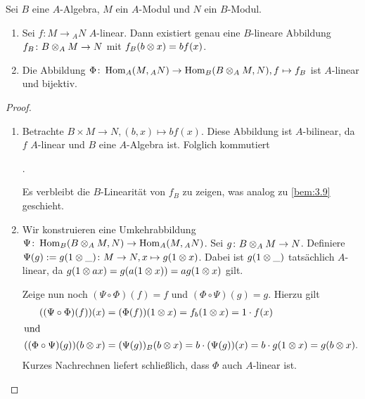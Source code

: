 \documentclass[12pt,a4paper]{scrartcl}
\theoremstyle{cplain}
\theoremstyle{cdef}
\begin{document}
\begin{satz}
	Sei $B$ eine $A$-Algebra, $M$ ein $A$-Modul und $N$ ein $B$-Modul.
	\begin{enumerate}
		\item Sei $f\colon M\to {}_AN$ $A$-linear. Dann existiert genau eine $B$-lineare Abbildung $f_B\colon B\otimes_AM\to N$ mit $f_B(b\otimes x) = bf(x)$. \label{thm:scalarerweiterung:i}
		\item Die Abbildung $\Phi\colon \operatorname{Hom}_A(M,{}_AN)\to \operatorname{Hom}_B(B\otimes_AM,N), f\mapsto f_B$ ist $A$-linear und bijektiv. \label{thm:scalarerweiterung:ii}
	\end{enumerate}
\end{satz}
\begin{proof}
	\leavevmode
	\begin{enumerate}[label=\ref{thm:scalarerweiterung:\roman*}]
		\item Betrachte $B\times M\to N, (b,x)\mapsto bf(x)$. Diese Abbildung ist $A$-bilinear, da $f$ $A$-linear und $B$ eine $A$-Algebra ist. Folglich kommutiert
		\begin{center}
			. %
		\end{center}
		Es verbleibt die $B$-Linearität von $f_B$ zu zeigen, was analog zu \cref{bem:3.9} geschieht.
		\item Wir konstruieren eine Umkehrabbildung $\Psi\colon \operatorname{Hom}_B(B\otimes_AM,N)\to \operatorname{Hom}_A(M,{}_AN)$. Sei $g\colon B\otimes_AM\to N$. Definiere $\Psi(g) := g(1\otimes \_)\colon M\to N, x\mapsto g(1\otimes x)$.
		Dabei ist $g(1\otimes\_)$ tatsächlich $A$-linear, da $g(1\otimes ax ) = g(a(1\otimes x)) = ag(1\otimes x)$ gilt.
		
		Zeige nun noch $(\Psi\circ \Phi)(f) = f$ und $(\Phi\circ\Psi)(g) = g$. Hierzu gilt
		\begin{align*}
			((\Psi\circ\Phi)(f))(x) &= (\Phi(f))(1\otimes x) = f_b(1\otimes x) =1\cdot f(x) \\
			\intertext{und}
			((\Phi\circ\Psi)(g))(b\otimes x) &= (\Psi(g))_B(b\otimes x) = b\cdot (\Psi(g))(x) = b\cdot g(1\otimes x) = g(b\otimes x).
		\end{align*}
		Kurzes Nachrechnen liefert schließlich, dass $\Phi$ auch $A$-linear ist.
		\qedhere
	\end{enumerate}	
\end{proof}
\end{document}
